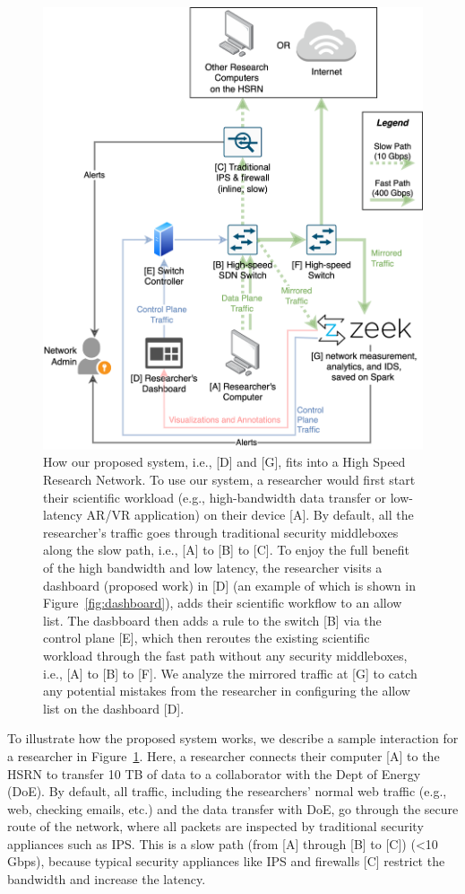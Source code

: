\begin{figure}[t]
    \centering
    \includegraphics[width=0.6\linewidth]{figures/system.png}
    \caption{How our proposed system, i.e., [D] and [G], fits into a High Speed Research Network. To use our system, a researcher would first start their scientific workload (e.g., high-bandwidth data transfer or low-latency AR/VR application) on their device [A]. By default, all the researcher's traffic goes through traditional security middleboxes along the slow path, i.e., [A] to [B] to [C]. To enjoy the full benefit of the high bandwidth and low latency, the researcher visits a dashboard (proposed work) in [D] (an example of which is shown in Figure~\ref{fig:dashboard}), adds their scientific workflow to an allow list. The dasbboard then adds a rule to the switch [B] via the control plane [E], which then reroutes the existing scientific workload through the fast path without any security middleboxes, i.e., [A] to [B] to [F]. We analyze the mirrored traffic at [G] to catch any potential mistakes from the researcher in configuring the allow list on the dashboard [D].}
    \label{fig:system}
\end{figure}

To illustrate how the proposed system works, we describe a sample interaction for a researcher in Figure~\ref{fig:system}. Here, a researcher connects their computer [A] to the HSRN to transfer 10 TB of data to a collaborator with the Dept of Energy (DoE). By default, all traffic, including the researchers' normal web traffic (e.g., web, checking emails, etc.) and the data transfer with DoE, go through the secure route of the network, where all packets are inspected by traditional security appliances such as IPS. This is a slow path (from [A] through [B] to [C]) (<10 Gbps), because  typical security appliances like IPS and firewalls [C] restrict the bandwidth and increase the latency.

